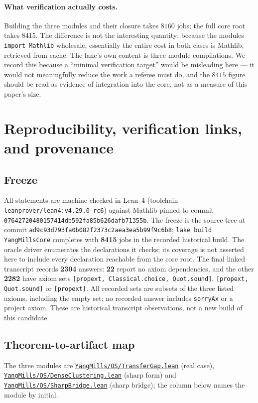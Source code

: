\documentclass[11pt]{article}
\theoremstyle{definition}
\newcommand{\lean}[1]{\texttt{#1}}
\newcommand{\anchor}{ad9c93d793fa0b082f2373c2aea3ea5b99f9c6b8}
\newcommand{\osfile}[2]{%
  \href{https://github.com/lluiseriksson/THE-ERIKSSON-PROGRAMME/blob/\anchor/YangMills/OS/#1.lean}{\nolinkurl{#2}}}
\begin{document}
\paragraph{What verification actually costs.}  Building the three modules
and their closure takes $8160$ jobs; the full core root takes $8415$.  The
difference is not the interesting quantity: because the modules
\lean{import Mathlib} wholesale, essentially the entire cost in both cases
is Mathlib, retrieved from cache.  The lane's own content is three module
compilations.  We record this because a ``minimal verification target''
would be misleading here --- it would not meaningfully reduce the work a
referee must do, and the $8415$ figure should be read as evidence of
integration into the core, not as a measure of this paper's size.

\section{Reproducibility, verification links, and provenance}
\label{sec:prov}

\subsection*{Freeze}

All statements are machine-checked in Lean~4 (toolchain
\lean{leanprover/lean4:v4.29.0-rc6}) against Mathlib pinned to commit
\lean{0764272048\-0157414db592fa85b626dafb71355b}.  The freeze is the
source tree at commit
\lean{\anchor}; \lean{lake build YangMillsCore} completes with
\textbf{8415} jobs in the recorded historical build.  The oracle driver
enumerates the declarations it checks; its coverage is not asserted here
to include every declaration reachable from the core root.  The final
linked transcript records \textbf{2304} answers: \textbf{22} report no
axiom dependencies, and the other \textbf{2282} have axiom sets
\lean{[propext, Classical.choice, Quot.sound]},
\lean{[propext, Quot.sound]} or \lean{[propext]}.
All recorded sets are subsets of the three listed axioms, including the
empty set; no recorded answer includes \lean{sorryAx} or a project axiom.
These are historical transcript observations, not a new build of this candidate.

\subsection*{Theorem-to-artifact map}

The three modules are
\osfile{TransferGap}{YangMills/OS/TransferGap.lean} (real case),
\osfile{DenseClustering}{YangMills/OS/DenseClustering.lean} (sharp form)
and \osfile{SharpBridge}{YangMills/OS/SharpBridge.lean} (sharp bridge);
the column below names the module by initial.
\end{document}
